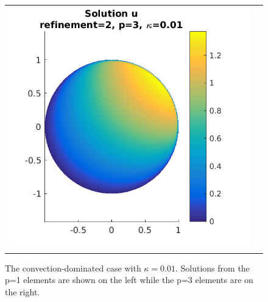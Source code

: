 \documentclass{article}
\begin{document}
\begin{figure}[!ht]
\begin{tabular}{c c}
\includegraphics[scale=0.7]{umu_233.png}
\end{tabular}
\caption{The convection-dominated case with $\kappa = 0.01$. Solutions from the p=1 elements are shown on the left while the p=3 elements are on the right.}
\label{fig:u100}
\end{figure}
\end{document}
